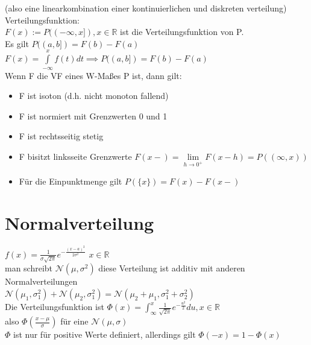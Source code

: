 \documentclass{article}
\begin{document}
	(also eine linearkombination einer kontinuierlichen und diskreten verteilung)\\
	Verteilungsfunktion:\\
	$F(x):= P((-\infty,x]), x\in\mathbb{R}$ ist die Verteilungsfunktion von P.\\
	Es gilt $P((a,b])=F(b)-F(a)$\\
	$F(x)=\int\limits^x_{-\infty} f(t)dt\implies P((a,b])=F(b)-F(a)$\\
	Wenn F die VF eines W-Maßes P ist, dann gilt:\\
	\begin{itemize}
	\item F ist isoton (d.h. nicht monoton fallend)
	\item F ist normiert mit Grenzwerten $0$ und 1
	\item F ist rechtsseitig stetig
	\item F bisitzt linksseite Grenzwerte $F(x-)=\lim\limits_{h\to 0^+} F(x-h) = P((\infty,x))$
	\item Für die Einpunktmenge gilt $P(\{x\}) = F(x)-F(x-)$
	\end{itemize}
	\section{Normalverteilung}
	$f(x) = \frac{1}{\sigma\sqrt{2\pi}} e^{-\frac{(x-a)^2}{2\sigma^2}}$ $x\in\mathbb{R}$\\
	man schreibt $\mathscr{N}(\mu,\sigma^2)$ diese Verteilung ist additiv mit anderen Normalverteilungen\\
	$\mathscr{N}(\mu_1,\sigma^2_1)+\mathscr{N}(\mu_2,\sigma^2_1) = \mathscr{N}(\mu_2+\mu_1,\sigma^2_1+\sigma^2_2)$\\
	Die Verteilungsfunktion ist $\Phi(x) = \int ^x_\infty \frac{1}{\sqrt{2\pi}}e^{-\frac{u^2}{2}} du, x\in\mathbb{R
	}$\\
	also $\Phi(\frac{x-\mu}{\sigma})$ für eine $\mathscr{N}(\mu,\sigma)$\\
	$\Phi$ ist nur für positive Werte definiert, allerdings gilt $\Phi(-x)=1-\Phi(x)$\\
\end{document}
